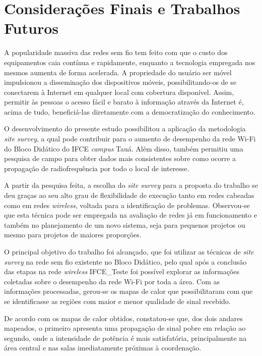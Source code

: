\chapter{Considerações Finais e Trabalhos Futuros}
\label{cap:conclusoes-e-trabalhos-futuros}

A popularidade massiva das redes sem fio tem feito com que o custo dos equipamentos caia contínua e rapidamente, enquanto a tecnologia empregada nos mesmos aumenta de forma acelerada. A propriedade do usuário ser móvel impulsionou a disseminação dos dispositivos móveis, possibilitando-os de se conectarem à Internet em qualquer local com cobertura disponível. Assim, permitir às pessoas o acesso fácil e barato à informação através da Internet é, acima de tudo, beneficiá-las diretamente com a democratização do conhecimento.

O desenvolvimento do presente estudo possibilitou a aplicação da metodologia \textit{site survey}, a qual pode contribuir para o aumento de desempenho da rede Wi-Fi do Bloco Didático do IFCE \textit{campus} Tauá. Além disso, também permitiu uma pesquisa de campo para obter dados mais consistentes sobre como ocorre a propagação de radiofrequência por todo o local de interesse.

A partir da pesquisa feita, a escolha do \textit{site survey} para a proposta do trabalho se deu graças ao seu alto grau de flexibilidade de execução tanto em redes cabeadas como em redes \textit{wireless}, voltada para a identificação de problemas. Observou-se que esta técnica pode ser empregada na avaliação de redes já em funcionamento e também no planejamento de um novo sistema, seja para pequenos projetos ou mesmo para projetos de maiores proporções.

O principal objetivo do trabalho foi alcançado, que foi utilizar as técnicas de \textit{site survey} na rede sem fio existente no Bloco Didático, pelo qual após a conclusão das etapas na rede \textit{wireless} IFCE\_Teste foi possível explorar as informações coletadas sobre o desempenho da rede Wi-Fi por toda a área. Com as informações processadas, gerou-se os mapas de calor que possibilitaram com que se identificasse as regiões com maior e menor qualidade de sinal recebido.

De acordo com os mapas de calor obtidos, constatou-se que, dos dois andares mapeados, o primeiro apresenta uma propagação de sinal pobre em relação ao segundo, onde a intensidade de potência é mais satisfatória, principalmente na área central e nas salas imediatamente próximas à coordenação.

